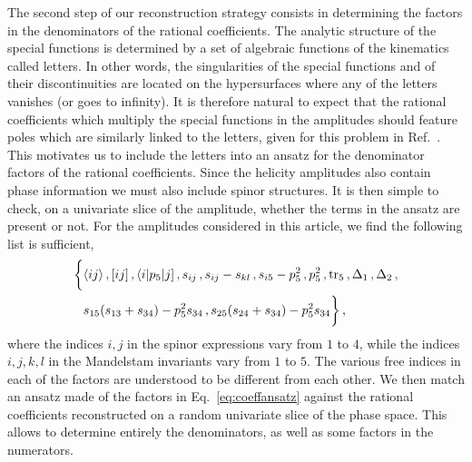 \documentclass[main.tex]{subfiles}
\begin{document}
The second step of our reconstruction strategy consists in determining the factors in the denominators of the rational coefficients. The analytic structure of the special functions is determined by a set of algebraic functions of the kinematics called letters. In other words, the singularities of the special functions and of their discontinuities are located on the hypersurfaces where any of the letters vanishes (or goes to infinity). It is therefore natural to expect that the rational coefficients which multiply the special functions in the amplitudes should feature poles which are similarly linked to the letters, given for this problem in Ref.~\cite{Abreu:2020jxa}. 
This motivates us to include the letters into an ansatz for the denominator factors of the rational coefficients. Since the helicity amplitudes also contain phase information we must also include spinor structures. It is then simple to check, on a univariate slice of the amplitude, whether the terms in the ansatz are present or not. For the amplitudes considered in this article, we find the following list is sufficient, 
\begin{equation}
\begin{aligned}
\biggl\{  & \langle ij\rangle \,,  [ij]  \,, \langle i|p_5|j]  \,, s_{ij} \,, s_{ij} - s_{kl} \,, 
  s_{i5} - p_5^2 \,, p_5^2 \,, \operatorname{\rm tr}_5 \, , \Delta_1 \,, \Delta_2 \, , \\
&  s_{15} (s_{13}+s_{34}) - p_5^2  s_{34}  \,,
 s_{25} (s_{24}+s_{34}) - p_5^2  s_{34} \biggr\} \,,
\end{aligned}
\label{eq:coeffansatz}
\end{equation}
where the indices $i,j$ in the spinor expressions vary from $1$ to $4$, while the indices $i,j,k,l$ in the Mandelstam invariants vary from $1$ to $5$. The various free indices in each of the factors are understood to be different from each other. We then match an ansatz made of the factors in Eq.~\eqref{eq:coeffansatz} against the rational coefficients reconstructed on a random univariate slice of the phase space. This allows to determine entirely the denominators, as well as some factors in the numerators.
\end{document}
